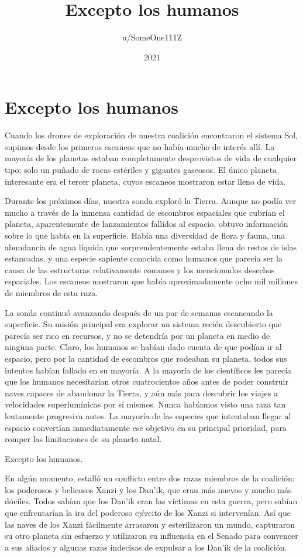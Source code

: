 \documentclass[spanish,12pt,a4paper, oneside]{book}
\title{Excepto los humanos}
\author{u/SomeOne111Z}
\date{2021}
\begin{document}
    \maketitle
    \chapter*{Excepto los humanos}
    Cuando los drones de exploración de nuestra coalición encontraron el sistema Sol, supimos desde los primeros escaneos que no había mucho de interés allí. La mayoría de los planetas estaban completamente desprovistos de vida de cualquier tipo; solo un puñado de rocas estériles y gigantes gaseosos. El único planeta interesante era el tercer planeta, cuyos escaneos mostraron estar lleno de vida.

    Durante los próximos días, nuestra sonda exploró la Tierra. Aunque no podía ver mucho a través de la inmensa cantidad de escombros espaciales que cubrían el planeta, aparentemente de lanzamientos fallidos al espacio, obtuvo información sobre lo que había en la superficie. Había una diversidad de flora y fauna, una abundancia de agua líquida que sorprendentemente estaba llena de restos de islas estancadas, y una especie sapiente conocida como humanos que parecía ser la causa de las estructuras relativamente comunes y los mencionados desechos espaciales. Los escaneos mostraron que había aproximadamente ocho mil millones de miembros de esta raza.

    La sonda continuó avanzando después de un par de semanas escaneando la superficie. Su misión principal era explorar un sistema recién descubierto que parecía ser rico en recursos, y no se detendría por un planeta en medio de ninguna parte. Claro, los humanos se habían dado cuenta de que podían ir al espacio, pero por la cantidad de escombros que rodeaban su planeta, todos sus intentos habían fallado en su mayoría. A la mayoría de los científicos les parecía que los humanos necesitarían otros cuatrocientos años antes de poder construir naves capaces de abandonar la Tierra, y aún más para descubrir los viajes a velocidades superlumínicas por sí mismos. Nunca habíamos visto una raza tan lentamente progresiva antes. La mayoría de las especies que intentaban llegar al espacio convertían inmediatamente ese objetivo en su principal prioridad, para romper las limitaciones de su planeta natal.

    Excepto los humanos.

    En algún momento, estalló un conflicto entre dos razas miembros de la coalición: los poderosos y belicosos Xanzi y los Dan'ik, que eran más nuevos y mucho más dóciles. Todos sabían que los Dan'ik eran las víctimas en esta guerra, pero sabían que enfrentarían la ira del poderoso ejército de los Xanzi si intervenían. Así que las naves de los Xanzi fácilmente arrasaron y esterilizaron un mundo, capturaron su otro planeta sin esfuerzo y utilizaron su influencia en el Senado para convencer a sus aliados y algunas razas indecisas de expulsar a los Dan'ik de la coalición.
\end{document}
